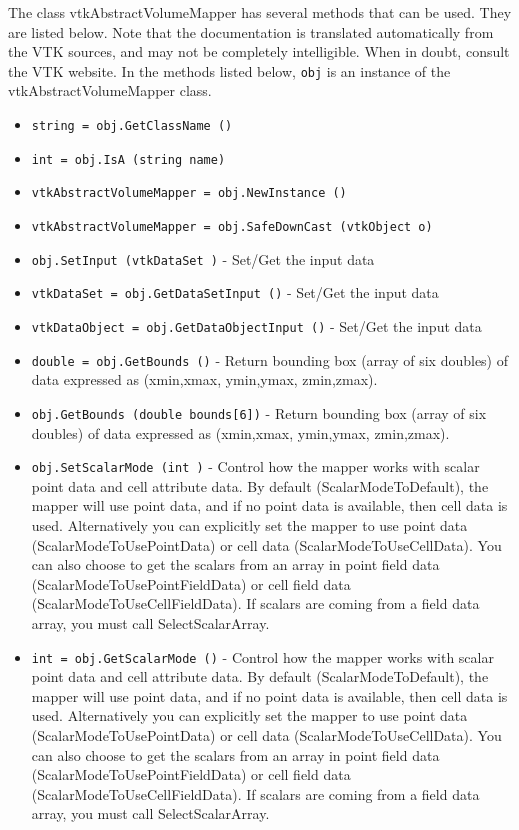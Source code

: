 The class vtkAbstractVolumeMapper has several methods that can be used.
  They are listed below.
Note that the documentation is translated automatically from the VTK sources,
and may not be completely intelligible.  When in doubt, consult the VTK website.
In the methods listed below, \verb|obj| is an instance of the vtkAbstractVolumeMapper class.
\begin{itemize}
\item  \verb|string = obj.GetClassName ()|

\item  \verb|int = obj.IsA (string name)|

\item  \verb|vtkAbstractVolumeMapper = obj.NewInstance ()|

\item  \verb|vtkAbstractVolumeMapper = obj.SafeDownCast (vtkObject o)|

\item  \verb|obj.SetInput (vtkDataSet )| -  Set/Get the input data

\item  \verb|vtkDataSet = obj.GetDataSetInput ()| -  Set/Get the input data

\item  \verb|vtkDataObject = obj.GetDataObjectInput ()| -  Set/Get the input data

\item  \verb|double = obj.GetBounds ()| -  Return bounding box (array of six doubles) of data expressed as
 (xmin,xmax, ymin,ymax, zmin,zmax).

\item  \verb|obj.GetBounds (double bounds[6])| -  Return bounding box (array of six doubles) of data expressed as
 (xmin,xmax, ymin,ymax, zmin,zmax).

\item  \verb|obj.SetScalarMode (int )| -  Control how the mapper works with scalar point data and cell attribute
 data.  By default (ScalarModeToDefault), the mapper will use point data,
 and if no point data is available, then cell data is used. Alternatively
 you can explicitly set the mapper to use point data
 (ScalarModeToUsePointData) or cell data (ScalarModeToUseCellData).
 You can also choose to get the scalars from an array in point field
 data (ScalarModeToUsePointFieldData) or cell field data
 (ScalarModeToUseCellFieldData).  If scalars are coming from a field
 data array, you must call SelectScalarArray.

\item  \verb|int = obj.GetScalarMode ()| -  Control how the mapper works with scalar point data and cell attribute
 data.  By default (ScalarModeToDefault), the mapper will use point data,
 and if no point data is available, then cell data is used. Alternatively
 you can explicitly set the mapper to use point data
 (ScalarModeToUsePointData) or cell data (ScalarModeToUseCellData).
 You can also choose to get the scalars from an array in point field
 data (ScalarModeToUsePointFieldData) or cell field data
 (ScalarModeToUseCellFieldData).  If scalars are coming from a field
 data array, you must call SelectScalarArray.


\end{itemize}
